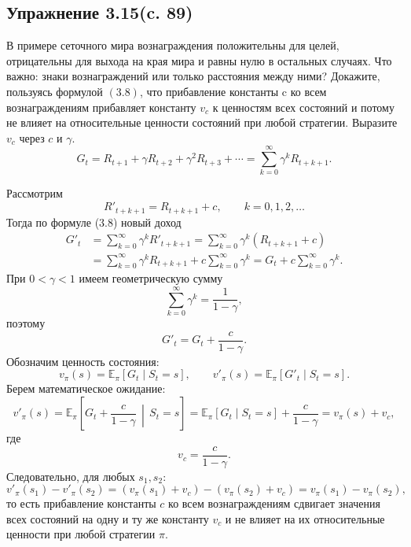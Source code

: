\subsection{Упражнение 3.15(c. 89)}
В примере сеточного мира вознаграждения положительны для
целей, отрицательны для выхода на края мира и равны нулю в остальных случаях. Что важно: знаки вознаграждений или только расстояния между ними? Докажите, пользуясь формулой $(3.8)$, что прибавление константы c ко всем вознаграждениям прибавляет константу $v_c$ к ценностям всех состояний и потому не влияет на относительные ценности состояний при любой стратегии. Выразите $v_c$
 через $c$ и $\gamma$.
\begin{equation}
    G_t = R_{t+1} + \gamma R_{t+2} + \gamma^2 R_{t+3} + \cdots
= \sum_{k=0}^{\infty} \gamma^k R_{t+k+1}.
\tag{3.8}
\end{equation}
\begin{solution}
    Рассмотрим
    \[
    R'_{t+k+1}=R_{t+k+1}+c,\qquad k=0,1,2,\dots
    \]
    Тогда по формуле (3.8) новый доход
    \[
    \begin{aligned}
    G'_t
    &= \sum_{k=0}^{\infty}\gamma^k R'_{t+k+1}
    = \sum_{k=0}^{\infty}\gamma^k (R_{t+k+1}+c) \\
    &= \sum_{k=0}^{\infty}\gamma^k R_{t+k+1}
    + c\sum_{k=0}^{\infty}\gamma^k
    = G_t + c\sum_{k=0}^{\infty}\gamma^k.
    \end{aligned}
    \]
    При $0 < \gamma<1$ имеем геометрическую сумму
    \[
    \sum_{k=0}^{\infty}\gamma^k=\frac{1}{1-\gamma},
    \]
    поэтому
    \[
    G'_t=G_t+\frac{c}{1-\gamma}.
    \]
    Обозначим ценность состояния:
    \[
    v_\pi(s)=\mathbb{E}_\pi[G_t\mid S_t=s],\qquad
    v'_\pi(s)=\mathbb{E}_\pi[G'_t\mid S_t=s].
    \]
    Берем математическое ожидание:
    \[
    v'_\pi(s)=\mathbb{E}_\pi\!\left[G_t+\frac{c}{1-\gamma}\,\middle|\,S_t=s\right]
    =\mathbb{E}_\pi[G_t\mid S_t=s]+\frac{c}{1-\gamma}
    =v_\pi(s)+v_c,
    \]
    где
    \[
    v_c=\frac{c}{1-\gamma}.
    \]
    Следовательно, для любых $s_1,s_2$:
    \[
    v'_\pi(s_1)-v'_\pi(s_2)=(v_\pi(s_1)+v_c)-(v_\pi(s_2)+v_c)=v_\pi(s_1)-v_\pi(s_2),
    \]
    то есть прибавление константы $c$ ко всем вознаграждениям сдвигает значения всех состояний на одну и ту же константу $v_c$
    и не влияет на их относительные ценности при любой стратегии $\pi$.
\end{solution}

